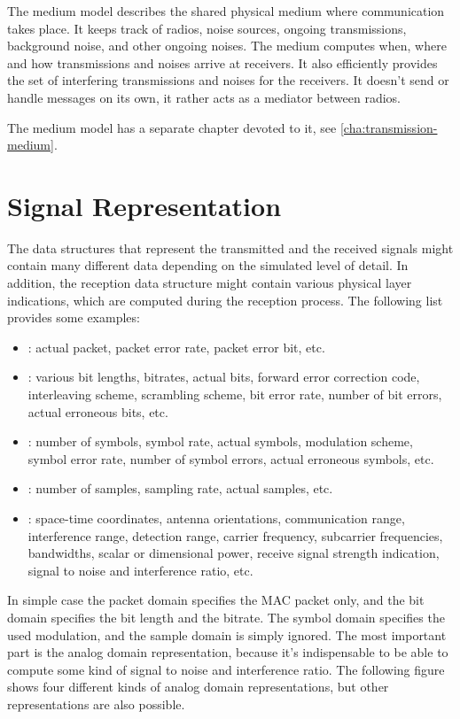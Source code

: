 The medium model describes the shared physical medium where communication takes
place. It keeps track of radios, noise sources, ongoing transmissions,
background noise, and other ongoing noises. The medium computes when, where and
how transmissions and noises arrive at receivers. It also efficiently provides
the set of interfering transmissions and noises for the receivers. It doesn't
send or handle messages on its own, it rather acts as a mediator between radios.

The medium model has a separate chapter devoted to it, see \ref{cha:transmission-medium}. 

\section{Signal Representation}

The data structures that represent the transmitted and the received signals
might contain many different data depending on the simulated level of detail. In
addition, the reception data structure might contain various physical layer
indications, which are computed during the reception process. The following list
provides some examples:

\begin{itemize}
  \item {}: actual packet, packet error rate, packet error bit,
etc.
  \item {}: various bit lengths, bitrates, actual bits, forward
error correction code, interleaving scheme, scrambling scheme, bit error rate,
number of bit errors, actual erroneous bits, etc.
  \item {}: number of symbols, symbol rate, actual symbols,
modulation scheme, symbol error rate, number of symbol errors, actual erroneous
symbols, etc.
  \item {}: number of samples, sampling rate, actual samples,
etc.
  \item {}: space-time coordinates, antenna orientations,
communication range, interference range, detection range, carrier frequency,
subcarrier frequencies, bandwidths, scalar or dimensional power, receive signal
strength indication, signal to noise and interference ratio, etc.
\end{itemize}

In simple case the packet domain specifies the MAC packet only, and the bit
domain specifies the bit length and the bitrate. The symbol domain specifies the
used modulation, and the sample domain is simply ignored. The most important
part is the analog domain representation, because it's indispensable to be able
to compute some kind of signal to noise and interference ratio. The following
figure shows four different kinds of analog domain representations, but other
representations are also possible.

